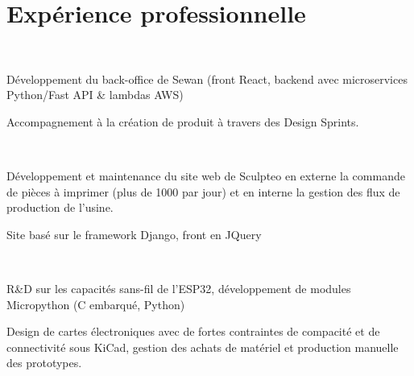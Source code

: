 \documentclass[]{cv-template}
\begin{document}
\hfill
\begin{minipage}[t]{0.65\textwidth}

\section{Expérience professionnelle}
\\
    \vspace{0.9em} %
\begin{tightemize}
\item Développement du back-office de Sewan (front React, backend avec microservices Python/Fast API \& lambdas AWS)
\item Accompagnement à la création de produit à travers des Design Sprints.
\end{tightemize}
\sectionsep

\\
\begin{tightemize}
\item Développement et maintenance du site web de Sculpteo en externe la commande de pièces à imprimer (plus de 1000 par jour) et en interne la gestion des flux de production de l'usine.
\item Site basé sur le framework Django, front en JQuery
\end{tightemize}
\sectionsep

\\
\begin{tightemize}
\item R\&D sur les capacités sans-fil de l'ESP32, développement de modules Micropython (C embarqué, Python)
\item Design de cartes électroniques avec de fortes contraintes de compacité et de connectivité sous KiCad, gestion des achats de matériel et production manuelle des prototypes.
\end{tightemize}
\sectionsep



\end{minipage}
\end{document}
